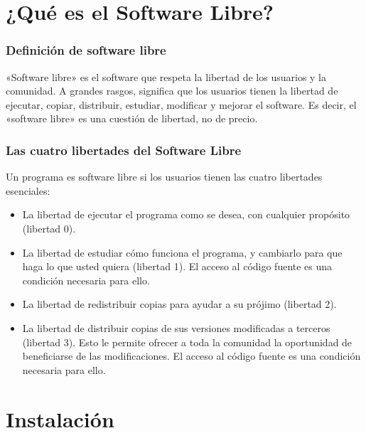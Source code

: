 \documentclass{beamer}
\begin{document}
\section{¿Qué es el Software Libre?}
\begin{frame}
\frametitle{Definición de software libre}
«Software libre» es el software que respeta la libertad de los usuarios y la comunidad. A grandes rasgos, significa que los usuarios tienen la libertad de ejecutar, copiar, distribuir, estudiar, modificar y mejorar el software. Es decir, el «software libre» es una cuestión de libertad, no de precio.

\end{frame}
\begin{frame}
\frametitle{Las cuatro libertades del Software Libre}
Un programa es software libre si los usuarios tienen las cuatro libertades esenciales:
\begin{itemize}
\item La libertad de ejecutar el programa como se desea, con cualquier propósito (libertad 0).
\item La libertad de estudiar cómo funciona el programa, y cambiarlo para que haga lo que usted quiera (libertad 1). El acceso al código fuente es una condición necesaria para ello.
\item La libertad de redistribuir copias para ayudar a su prójimo (libertad 2).
\item La libertad de distribuir copias de sus versiones modificadas a terceros (libertad 3). Esto le permite ofrecer a toda la comunidad la oportunidad de beneficiarse de las modificaciones. El acceso al código fuente es una condición necesaria para ello.
\end{itemize}
\end{frame}

\section{Instalación} %

\end{document}
